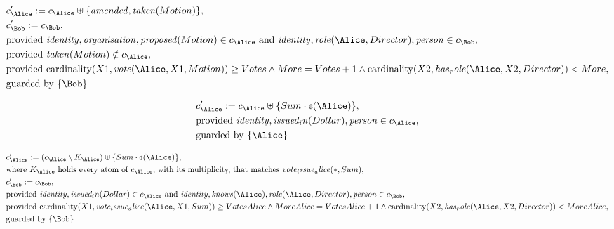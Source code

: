 \begin{align*}
&
c'_
{
\Alice
}
 := 
c_
{
\Alice
}
 \uplus 
\{
\mathit{
amended
}
,
\mathit{
taken
}
(
Motion
)
\}
,\\
&
c'_
{
\Bob
}
 := 
c_
{
\Bob
}
,\\
&
\text{provided } 
\mathit{
identity
}
,
\mathit{
organisation
}
,
\mathit{
proposed
}
(
Motion
)
 \in c_
{
\Alice
}
 \text{ and } 
\mathit{
identity
}
,
\mathit{
role
}
(
\Alice
,
Director
)
,
\mathit{
person
}
 \in c_
{
\Bob
}
,\\
&
\text{provided } 
\mathit{
taken
}
(
Motion
)
 \notin c_
{
\Alice
}
,\\
&
\text{provided } 
\mathrm{cardinality}(
X1
,
\mathit{
vote
}
(
\Alice
,
X1
,
Motion
)
)
\ge
Votes
\land
More
=
Votes
+
1
\land
\mathrm{cardinality}(
X2
,
\mathit{
has_role
}
(
\Alice
,
X2
,
Director
)
)
<
More
,\\
&
\text{guarded by } \{
\Bob
\}
\end{align*}

\begin{align*}
&
c'_
{
\Alice
}
 := 
c_
{
\Alice
}
 \uplus 
\{
Sum
\cdot
\text{\textcent}
(
\Alice
)
\}
,\\
&
\text{provided } 
\mathit{
identity
}
,
\mathit{
issued_in
}
(
Dollar
)
,
\mathit{
person
}
 \in c_
{
\Alice
}
,\\
&
\text{guarded by } \{
\Alice
\}
\end{align*}

\begin{align*}
&
c'_
{
\Alice
}
 := 
(
c_
{
\Alice
}
 \setminus K_
{
\Alice
}
) \uplus 
\{
Sum
\cdot
\text{\textcent}
(
\Alice
)
\}
,\\
&
\text{where } K_
{
\Alice
}
 \text{ holds every atom of } c_
{
\Alice
}
 \text{, with its multiplicity, that matches } 
\mathit{
vote_issue_alice
}
(
\ast
,
Sum
)
,\\
&
c'_
{
\Bob
}
 := 
c_
{
\Bob
}
,\\
&
\text{provided } 
\mathit{
identity
}
,
\mathit{
issued_in
}
(
Dollar
)
 \in c_
{
\Alice
}
 \text{ and } 
\mathit{
identity
}
,
\mathit{
knows
}
(
\Alice
)
,
\mathit{
role
}
(
\Alice
,
Director
)
,
\mathit{
person
}
 \in c_
{
\Bob
}
,\\
&
\text{provided } 
\mathrm{cardinality}(
X1
,
\mathit{
vote_issue_alice
}
(
\Alice
,
X1
,
Sum
)
)
\ge
VotesAlice
\land
MoreAlice
=
VotesAlice
+
1
\land
\mathrm{cardinality}(
X2
,
\mathit{
has_role
}
(
\Alice
,
X2
,
Director
)
)
<
MoreAlice
,\\
&
\text{guarded by } \{
\Bob
\}
\end{align*}
